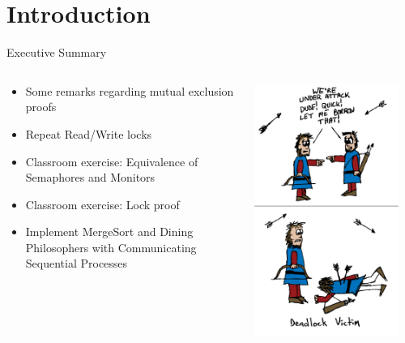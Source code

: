 \section*{Introduction}

\begin{frame}{Executive Summary}
  \begin{columns}[c]
    \begin{column}{0.6\textwidth}
      \begin{itemize}
      \item Some remarks regarding mutual exclusion proofs
      \item Repeat Read/Write locks
      \item Classroom exercise: Equivalence of Semaphores and Monitors
      \item Classroom exercise: Lock proof
      \item Implement MergeSort and Dining Philosophers with
        Communicating Sequential Processes
  \end{itemize}
      \end{column}
    \begin{column}{0.4\textwidth}
      \begin{center}
        \includegraphics[width=0.9\textwidth]{figures/deadlock}\\

\end{center}
\end{column}
\end{columns}
\end{frame}

